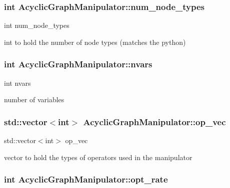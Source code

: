 \subsubsection[{\texorpdfstring{num\+\_\+node\+\_\+types}{num_node_types}}]{\setlength{\rightskip}{0pt plus 5cm}int Acyclic\+Graph\+Manipulator\+::num\+\_\+node\+\_\+types}\hypertarget{classAcyclicGraphManipulator_a69ebad78a28b2ce356e82db1f883c19d}{}\label{classAcyclicGraphManipulator_a69ebad78a28b2ce356e82db1f883c19d}


int num\+\_\+node\+\_\+types 

int to hold the number of node types (matches the python) 
\subsubsection[{\texorpdfstring{nvars}{nvars}}]{\setlength{\rightskip}{0pt plus 5cm}int Acyclic\+Graph\+Manipulator\+::nvars}\hypertarget{classAcyclicGraphManipulator_a1daae08faa803d96d51c71911a543bde}{}\label{classAcyclicGraphManipulator_a1daae08faa803d96d51c71911a543bde}


int nvars 

number of variables 
\subsubsection[{\texorpdfstring{op\+\_\+vec}{op_vec}}]{\setlength{\rightskip}{0pt plus 5cm}std\+::vector$<$int$>$ Acyclic\+Graph\+Manipulator\+::op\+\_\+vec}\hypertarget{classAcyclicGraphManipulator_a23c0c3e199c8d25e4ca4946410ceb96b}{}\label{classAcyclicGraphManipulator_a23c0c3e199c8d25e4ca4946410ceb96b}


std\+::vector$<$int$>$ op\+\_\+vec 

vector to hold the types of operators used in the manipulator 
\subsubsection[{\texorpdfstring{opt\+\_\+rate}{opt_rate}}]{\setlength{\rightskip}{0pt plus 5cm}int Acyclic\+Graph\+Manipulator\+::opt\+\_\+rate}\hypertarget{classAcyclicGraphManipulator_ac6d1c55c9a9012663f66b3c027abef82}{}\label{classAcyclicGraphManipulator_ac6d1c55c9a9012663f66b3c027abef82}


